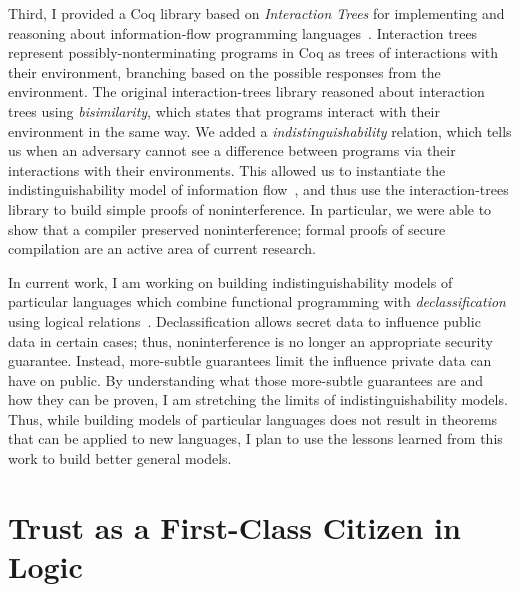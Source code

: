 \documentclass{article}
\theoremstyle{definition}
\begin{document}
Third, I provided a Coq library based on \emph{Interaction Trees} for implementing and reasoning about information-flow programming languages~\citep{SilverHHCZ22}.
Interaction trees represent possibly-nonterminating programs in Coq as trees of interactions with their environment, branching based on the possible responses from the environment.
The original interaction-trees library reasoned about interaction trees using \emph{bisimilarity}, which states that programs interact with their environment in the same way.
We added a \emph{indistinguishability} relation, which tells us when an adversary cannot see a difference between programs via their interactions with their environments.
This allowed us to instantiate the indistinguishability model of information flow~\citep{SabelfeldS99}, and thus use the interaction-trees library to build simple proofs of noninterference.
In particular, we were able to show that a compiler preserved noninterference; formal proofs of secure compilation are an active area of current research.

In current work, I am working on building indistinguishability models of particular languages which combine functional programming with \emph{declassification} using logical relations~\citep{MenzHLG22}.
Declassification allows secret data to influence public data in certain cases; thus, noninterference is no longer an appropriate security guarantee.
Instead, more-subtle guarantees limit the influence private data can have on public.
By understanding what those more-subtle guarantees are and how they can be proven, I am stretching the limits of indistinguishability models.
Thus, while building models of particular languages does not result in theorems that can be applied to new languages, I plan to use the lessons learned from this work to build better general models.

\section*{Trust as a First-Class Citizen in Logic}
\end{document}
